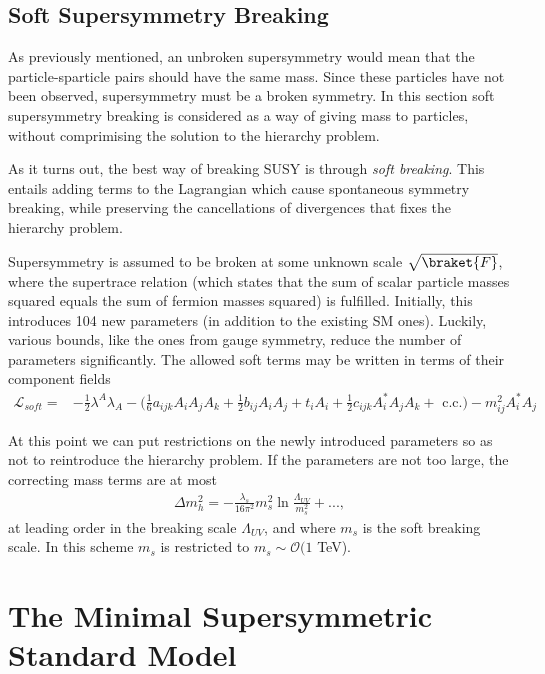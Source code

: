 \documentclass[twoside,english]{uiofysmaster}
\begin{document}
\subsection{Soft Supersymmetry Breaking}

As previously mentioned, an unbroken supersymmetry would mean that the particle-sparticle pairs should have the same mass. Since these particles have not been observed, supersymmetry must be a broken symmetry. In this section soft supersymmetry breaking is considered as a way of giving mass to particles, without comprimising the solution to the hierarchy problem.

As it turns out, the best way of breaking SUSY is through \textit{soft breaking}. This entails adding terms to the Lagrangian which cause spontaneous symmetry breaking, while preserving the cancellations of divergences that fixes the hierarchy problem.

Supersymmetry is assumed to be broken at some unknown scale $\sqrt{\braket{F}}$, where the supertrace relation (which states that the sum of scalar particle masses squared equals the sum of fermion masses squared) is fulfilled. Initially, this introduces 104 new parameters (in addition to the existing SM ones). Luckily, various bounds, like the ones from gauge symmetry, reduce the number of parameters significantly. The allowed soft terms may be written in terms of their component fields
\begin{align}
\mathcal{L}_{soft} =& - \frac{1}{2} \lambda^A \lambda_A - \Big(\frac{1}{6} a_{ijk} A_i A_j A_k + \frac{1}{2} b_{ij} A_i A_j + t_i A_i + \frac{1}{2} c_{ijk} A^{*}_i A_jA_k + \text{ c.c.} \Big) - m_{ij}^2 A_i^*A_j
\end{align}

At this point we can put restrictions on the newly introduced parameters so as not to reintroduce the hierarchy problem. If the parameters are not too large, the correcting mass terms are at most
\begin{align*}
\Delta m_h^2 = - \frac{\lambda_s}{16 \pi^2} m_s^2\ln \frac{\Lambda_{UV}}{m_s^2} +...,
\end{align*}
at leading order in the breaking scale $\Lambda_{UV}$, and where $m_s$ is the soft breaking scale. In this scheme $m_s$ is restricted to $m_s \sim \mathcal{O}(1$ TeV).

\section{The Minimal Supersymmetric Standard Model}
\end{document}
